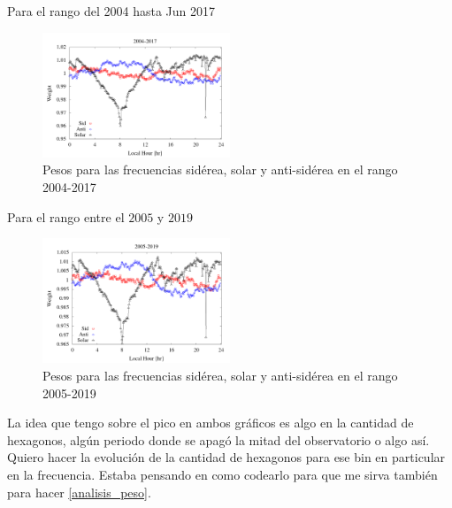 Para el rango del 2004 hasta Jun 2017

\begin{figure}[H]
	\centering
	\includegraphics[width=0.5\textwidth]{Graficos/weigth2004-2017.png}
	\caption{Pesos para las frecuencias sidérea, solar y anti-sidérea en el rango 2004-2017}
	\label{fig:pesos_2017}
\end{figure}



Para el rango entre el $2005$ y $2019$
\begin{figure}[H]
	\centering
	\includegraphics[width=0.5\textwidth]{Graficos/weigth2005-2019.png}
	\caption{Pesos para las frecuencias sidérea, solar y anti-sidérea en el rango 2005-2019}
	\label{fig:pesos_2019}
\end{figure}




La idea que tengo sobre el pico en ambos gráficos es algo en la cantidad de hexagonos, algún periodo donde se apagó la mitad del observatorio o algo así. Quiero hacer la evolución de la cantidad de hexagonos para ese bin en particular en la frecuencia. Estaba pensando en como codearlo para que me sirva también para hacer \ref{analisis_peso}.




